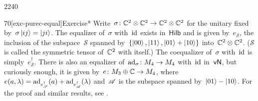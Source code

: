 \begin{parsec}{2240}
\begin{point}{70}[exc-purec-equal]{Exercise*}
Write~$\sigma\colon \mathbb{C}^2 \otimes \mathbb{C}^2 \to \mathbb{C}^2 \otimes \mathbb{C}^2$
    for the unitary
    fixed by~$\sigma \ket{ij} = \ket{ji}$.
The equalizer of~$\sigma$ with~$\mathrm{id}$ exists in~$\mathsf{Hilb}$
    and is given by~$e_{\mathscr{S}}$, the inclusion
    of the subspace~$\mathscr{S}$
    spanned by~$\{\ket{00}, \ket{11}, \ket{01}+\ket{10}\}$
    into~$\mathbb{C}^2\otimes \mathbb{C}^2$.
    ($\mathscr{S}$ is called the symmetric tensor of~$\mathbb{C}^2$ with itself.)
    The coequalizer of~$\sigma$ with~$\mathrm{id}$ is simply~$e_{\mathscr{S}}^\dagger$.
    There is also an equalizer of~$\mathrm{ad}_{\sigma}\colon M_4 \to M_4$ with~$\mathrm{id}$
    in~$\mathsf{vN}$, but curiously enough, it is given
    by~$e \colon M_3 \oplus \mathbb{C} \to M_4$,
    where~$e(a,\lambda) =
            \mathrm{ad}_{e^\dagger_{\mathscr{S}}}(a) +
            \mathrm{ad}_{e^\dagger_{\mathscr{A}}}(\lambda)$
     and~$\mathscr{A}$ is the subspace spanned by~$\ket{01} - \ket{10}$.
     For the proof and similar results, see \cite{bags}.


\end{point}
\end{parsec}
